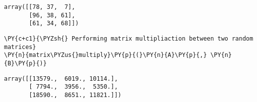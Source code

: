             \begin{tcolorbox}[breakable, size=fbox, boxrule=.5pt, pad at break*=1mm, opacityfill=0]
\begin{Verbatim}[commandchars=\\\{\}]
array([[78, 37,  7],
       [96, 38, 61],
       [61, 34, 68]])
\end{Verbatim}
\end{tcolorbox}
        
    \begin{tcolorbox}[breakable, size=fbox, boxrule=1pt, pad at break*=1mm,colback=cellbackground, colframe=cellborder]
\begin{Verbatim}[commandchars=\\\{\}]
\PY{c+c1}{\PYZsh{} Performing matrix multipliaction between two random matrices}
\PY{n}{matrix\PYZus{}multiply}\PY{p}{(}\PY{n}{A}\PY{p}{,} \PY{n}{B}\PY{p}{)}
\end{Verbatim}
\end{tcolorbox}

            \begin{tcolorbox}[breakable, size=fbox, boxrule=.5pt, pad at break*=1mm, opacityfill=0]
\begin{Verbatim}[commandchars=\\\{\}]
array([[13579.,  6019., 10114.],
       [ 7794.,  3956.,  5350.],
       [18590.,  8651., 11821.]])
\end{Verbatim}
\end{tcolorbox}
